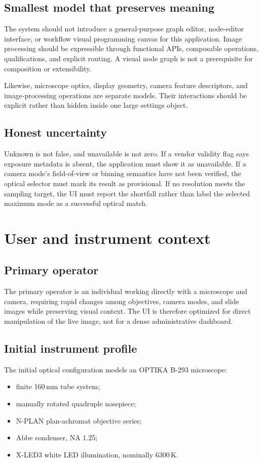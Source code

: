 \documentclass[11pt,a4paper,oneside]{article}
\begin{document}
\subsection{Smallest model that preserves meaning}
The system should not introduce a general-purpose graph editor, node-editor interface, or workflow visual programming canvas for this application. Image processing should be expressible through functional APIs, composable operations, qualifications, and explicit routing. A visual node graph is not a prerequisite for composition or extensibility.

Likewise, microscope optics, display geometry, camera feature descriptors, and image-processing operations are separate models. Their interactions should be explicit rather than hidden inside one large settings object.

\subsection{Honest uncertainty}
Unknown is not false, and unavailable is not zero. If a vendor validity flag says exposure metadata is absent, the application must show it as unavailable. If a camera mode's field-of-view or binning semantics have not been verified, the optical selector must mark its result as provisional. If no resolution meets the sampling target, the UI must report the shortfall rather than label the selected maximum mode as a successful optical match.

\section{User and instrument context}

\subsection{Primary operator}
The primary operator is an individual working directly with a microscope and camera, requiring rapid changes among objectives, camera modes, and slide images while preserving visual context. The UI is therefore optimized for direct manipulation of the live image, not for a dense administrative dashboard.

\subsection{Initial instrument profile}
The initial optical configuration models an OPTIKA B-293 microscope:
\begin{itemize}
  \item finite 160\,mm tube system;
  \item manually rotated quadruple nosepiece;
  \item N-PLAN plan-achromat objective series;
  \item Abbe condenser, NA 1.25;
  \item X-LED3 white LED illumination, nominally 6300\,K.
\end{itemize}
\end{document}

